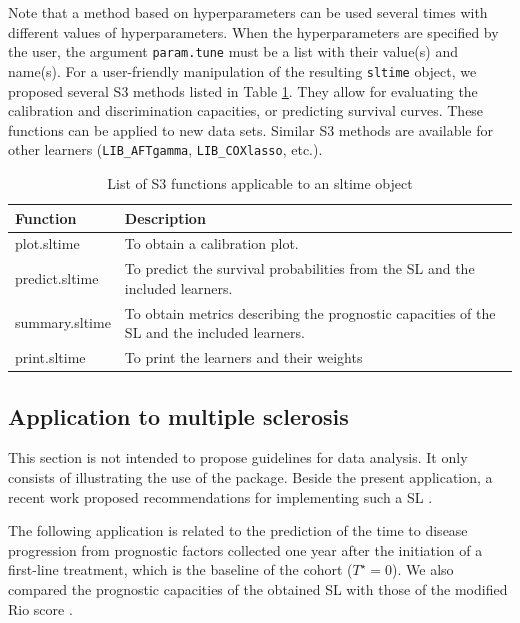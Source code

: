 Note that a method based on hyperparameters can be used several times with different values of hyperparameters. When the hyperparameters are specified by the user, the argument \texttt{param.tune} must be a list with their value(s) and name(s). For a user-friendly manipulation of the resulting \texttt{sltime} object, we proposed several S3 methods listed in Table \ref{tab:s3-tab-static}. They allow for evaluating the calibration and discrimination capacities, or predicting survival curves. These functions can be applied to new data sets. Similar S3 methods are available for other learners (\texttt{LIB\_AFTgamma}, \texttt{LIB\_COXlasso}, etc.).

\begin{table}
\centering
\caption{\label{tab:s3-tab-static}List of S3 functions applicable to an sltime object}
\centering
\fontsize{8}{10}\selectfont
\begin{tabular}[t]{l>{\raggedright\arraybackslash}p{11cm}}
\toprule
Function & Description\\
\midrule
plot.sltime & To obtain a calibration plot.\\
predict.sltime & To predict the survival probabilities from the SL and the included learners.\\
summary.sltime & To obtain metrics describing the prognostic capacities of the SL and the included learners.\\
print.sltime & To print the learners and their weights\\
\bottomrule
\end{tabular}
\end{table}

\hypertarget{application-to-multiple-sclerosis}{%
\subsection{Application to multiple sclerosis}\label{application-to-multiple-sclerosis}}

This section is not intended to propose guidelines for data analysis. It only consists of illustrating the use of the  package. Beside the present application, a recent work proposed recommendations for implementing such a SL \citep{phillips_practical_2023}.

The following application is related to the prediction of the time to disease progression from prognostic factors collected one year after the initiation of a first-line treatment, which is the baseline of the cohort (\(T^\star = 0\)). We also compared the prognostic capacities of the obtained SL with those of the modified Rio score \citep{sormaniScoringTreatmentResponse2013a}.

